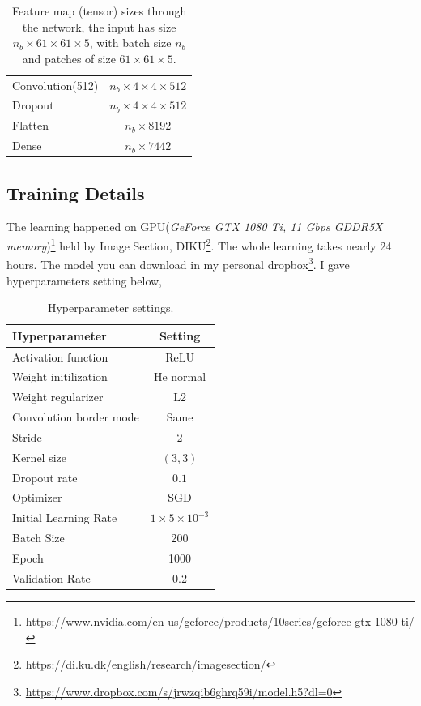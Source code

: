 \begin{table}[h!]
\begin{tabular}{ l | c  }
            Convolution(512) & $n_b\times4\times4\times512$  \\
            Dropout & $n_b\times4\times4\times512$ \\
            Flatten & $n_b\times8192$ \\
            Dense & $n_b\times7442$ \\    
        \end{tabular}
        \caption{Feature map (tensor) sizes through the network, the input has size $n_b\times61\times61\times5$, with batch size $n_b$ and patches of size $61\times61\times5$.}
        \label{table:layers}
    \end{table}

\subsection{Training Details}
    The learning happened on GPU(\textit{GeForce GTX 1080 Ti, 11 Gbps GDDR5X memory})\footnote{\url{https://www.nvidia.com/en-us/geforce/products/10series/geforce-gtx-1080-ti/}} held by Image Section, DIKU\footnote{\url{https://di.ku.dk/english/research/imagesection/}}. The whole learning takes nearly 24 hours. The model you can download in my personal dropbox\footnote{\url{https://www.dropbox.com/s/jrwzqib6ghrq59i/model.h5?dl=0}}. I gave hyperparameters setting below,
    \begin{table}[h!]
        \centering
        \begin{tabular}{ l | c  }
            Hyperparameter  & Setting \\ \hline
            Activation function & ReLU \\
            Weight initilization & He normal\cite{sutskever2013importance} \\
            Weight regularizer &  L2 \cite{hinton2006fast} \\
            Convolution border mode  & Same \\
            Stride & 2 \\ 
            Kernel size & $(3, 3)$ \\
            Dropout rate & $0.1$ \\
            Optimizer & SGD \\
            Initial Learning Rate & $1\times 5\times10^{-3}$ \\
            Batch Size & 200 \\
            Epoch & 1000 \\
            Validation Rate & 0.2 \\
        \end{tabular}
        \caption{Hyperparameter settings.}
        \label{table:hyper}
    \end{table}
